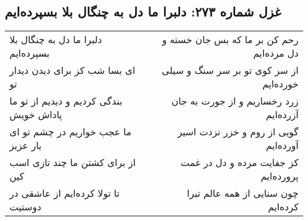 \begin{center}
\section*{غزل شماره ۲۷۳: دلبرا ما دل به چنگال بلا بسپرده‌ایم}
\label{sec:273}
\begin{longtable}{l p{0.5cm} r}
دلبرا ما دل به چنگال بلا بسپرده‌ایم
&&
رحم کن بر ما که بس جان خسته و دل مرده‌ایم
\\
ای بسا شب کز برای دیدن دیدار تو
&&
از سر کوی تو بر سر سنگ و سیلی خورده‌ایم
\\
بندگی کردیم و دیدیم از تو ما پاداش خویش
&&
زرد رخساریم و از جورت به جان آزرده‌ایم
\\
ما عجب خواریم در چشم تو ای یار عزیز
&&
گویی از روم و خزر نزدت اسیر آورده‌ایم
\\
از برای کشتن ما چند تازی اسب کین
&&
کز جفایت مرده و دل در غمت پرورده‌ایم
\\
تا تولا کرده‌ایم از عاشقی در دوستیت
&&
چون سنایی از همه عالم تبرا کرده‌ایم
\\
\end{longtable}
\end{center}
